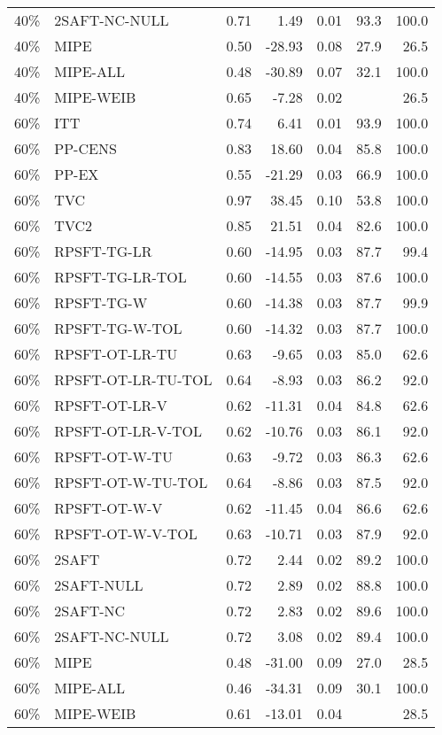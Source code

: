 \begin{table}[ht]
{\begin{tabular}{llrrrrr}
  40\% & 2SAFT-NC-NULL & 0.71 & 1.49 & 0.01 & 93.3 & 100.0 \\ 
  40\% & MIPE & 0.50 & -28.93 & 0.08 & 27.9 & 26.5 \\ 
  40\% & MIPE-ALL & 0.48 & -30.89 & 0.07 & 32.1 & 100.0 \\ 
  40\% & MIPE-WEIB & 0.65 & -7.28 & 0.02 &  & 26.5 \\ 
   \hline
60\% & ITT & 0.74 & 6.41 & 0.01 & 93.9 & 100.0 \\ 
  60\% & PP-CENS & 0.83 & 18.60 & 0.04 & 85.8 & 100.0 \\ 
  60\% & PP-EX & 0.55 & -21.29 & 0.03 & 66.9 & 100.0 \\ 
  60\% & TVC & 0.97 & 38.45 & 0.10 & 53.8 & 100.0 \\ 
  60\% & TVC2 & 0.85 & 21.51 & 0.04 & 82.6 & 100.0 \\ 
   \hline
60\% & RPSFT-TG-LR & 0.60 & -14.95 & 0.03 & 87.7 & 99.4 \\ 
  60\% & RPSFT-TG-LR-TOL & 0.60 & -14.55 & 0.03 & 87.6 & 100.0 \\ 
  60\% & RPSFT-TG-W & 0.60 & -14.38 & 0.03 & 87.7 & 99.9 \\ 
  60\% & RPSFT-TG-W-TOL & 0.60 & -14.32 & 0.03 & 87.7 & 100.0 \\ 
  60\% & RPSFT-OT-LR-TU & 0.63 & -9.65 & 0.03 & 85.0 & 62.6 \\ 
  60\% & RPSFT-OT-LR-TU-TOL & 0.64 & -8.93 & 0.03 & 86.2 & 92.0 \\ 
  60\% & RPSFT-OT-LR-V & 0.62 & -11.31 & 0.04 & 84.8 & 62.6 \\ 
  60\% & RPSFT-OT-LR-V-TOL & 0.62 & -10.76 & 0.03 & 86.1 & 92.0 \\ 
   \hline
60\% & RPSFT-OT-W-TU & 0.63 & -9.72 & 0.03 & 86.3 & 62.6 \\ 
  60\% & RPSFT-OT-W-TU-TOL & 0.64 & -8.86 & 0.03 & 87.5 & 92.0 \\ 
  60\% & RPSFT-OT-W-V & 0.62 & -11.45 & 0.04 & 86.6 & 62.6 \\ 
  60\% & RPSFT-OT-W-V-TOL & 0.63 & -10.71 & 0.03 & 87.9 & 92.0 \\ 
   \hline
60\% & 2SAFT & 0.72 & 2.44 & 0.02 & 89.2 & 100.0 \\ 
  60\% & 2SAFT-NULL & 0.72 & 2.89 & 0.02 & 88.8 & 100.0 \\ 
  60\% & 2SAFT-NC & 0.72 & 2.83 & 0.02 & 89.6 & 100.0 \\ 
  60\% & 2SAFT-NC-NULL & 0.72 & 3.08 & 0.02 & 89.4 & 100.0 \\ 
  60\% & MIPE & 0.48 & -31.00 & 0.09 & 27.0 & 28.5 \\ 
  60\% & MIPE-ALL & 0.46 & -34.31 & 0.09 & 30.1 & 100.0 \\ 
  60\% & MIPE-WEIB & 0.61 & -13.01 & 0.04 &  & 28.5 \\ 
   \hline
\end{tabular}
}
\end{table}
